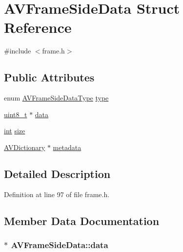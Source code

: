 \hypertarget{struct_a_v_frame_side_data}{}\section{A\+V\+Frame\+Side\+Data Struct Reference}
\label{struct_a_v_frame_side_data}


{\ttfamily \#include $<$frame.\+h$>$}

\subsection*{Public Attributes}
\begin{DoxyCompactItemize}
\item 
enum \hyperlink{group__lavu__frame_gae01fa7e427274293aacdf2adc17076bc}{A\+V\+Frame\+Side\+Data\+Type} \hyperlink{struct_a_v_frame_side_data_a07ff3499827c124591ff4bae6f68eec0}{type}
\item 
\hyperlink{lib-src_2ffmpeg_2win32_2stdint_8h_a9a941819355e6f658991890ff66b4b0e}{uint8\+\_\+t} $\ast$ \hyperlink{struct_a_v_frame_side_data_a76937ad48652a5a0cc4bff65fc6c886e}{data}
\item 
\hyperlink{xmltok_8h_a5a0d4a5641ce434f1d23533f2b2e6653}{int} \hyperlink{struct_a_v_frame_side_data_aa8418cdc71a76dfab523445b17f10028}{size}
\item 
\hyperlink{group__lavu__dict_ga1d7cc0833bee918994a600556410315f}{A\+V\+Dictionary} $\ast$ \hyperlink{struct_a_v_frame_side_data_a1b5aa30410c54c8aebefa1a791616e9f}{metadata}
\end{DoxyCompactItemize}


\subsection{Detailed Description}


Definition at line 97 of file frame.\+h.



\subsection{Member Data Documentation}
\subsubsection[{\texorpdfstring{data}{data}}]{$\ast$ A\+V\+Frame\+Side\+Data\+::data}\hypertarget{struct_a_v_frame_side_data_a76937ad48652a5a0cc4bff65fc6c886e}{}\label{struct_a_v_frame_side_data_a76937ad48652a5a0cc4bff65fc6c886e}



